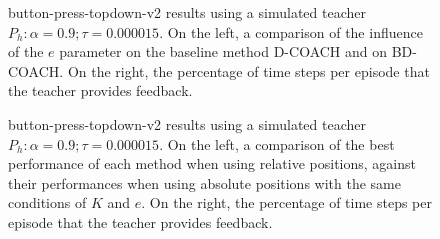 

 \begin{figure}[H]
  \centering
   \hfill
  \caption{button-press-topdown-v2 results using a simulated teacher $P_h: \alpha = 0.9; \tau =  0.000015$. On the left, a comparison of the influence of the $e$ parameter on the baseline method D-COACH and on BD-COACH. On the right, the percentage of time steps per episode that the teacher provides feedback.}
  \label{fig:results-button-press-topdown-v2-same-buffer}
\end{figure}




 \begin{figure}[H]
  \centering
   \caption{button-press-topdown-v2 results using a simulated teacher $P_h: \alpha = 0.9; \tau =  0.000015$. On the left, a comparison of the best performance of each method when using relative positions, against their performances when using absolute positions with the same conditions of $K$ and $e$. On the right, the percentage of time steps per episode that the teacher  provides feedback.}
  \label{fig:resultsbutton-press-topdown-v2-best}
\end{figure}